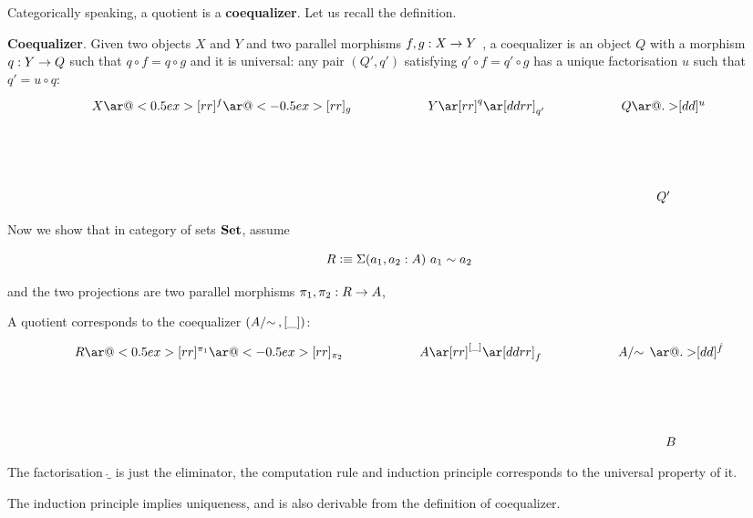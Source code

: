 Categorically speaking, a quotient is a \textbf{coequalizer}. Let us recall the definition.


\begin{definition}
\textbf{Coequalizer}.
Given two objects $X$ and $Y$ and two parallel morphisms $f, g : X \rightarrow Y$ , a coequalizer is an object $Q$ with a morphism $q : Y \rightarrow Q$ such that $q \circ f = q \circ g$ and it is universal: any pair $(Q' , q')$ satisfying $q' \circ f = q' \circ g$ has a unique factorisation $u$ such that $q' = u \circ q$:
\begin{displaymath}
    \xymatrix{X \ar@<0.5ex>[rr]^f \ar@<-0.5ex>[rr]_g && Y \ar[rr]^q
      \ar[ddrr]_{q'} && Q
      \ar@{.>}[dd]^u \\ \\
& &&& Q' }
\end{displaymath}
\end{definition}


Now we show that in category of sets $\operatorname{\mathbf{Set}}$, assume

$$R \vcentcolon\equiv \Sigma (a_1,a_2 : A) ~ a_1 \sim a_2$$


and the two projections are two parallel morphisms $\pi_1,\pi_2 : R \rightarrow A$,

A quotient corresponds to the coequalizer $(\qset{A},[\_])$:
\begin{displaymath}
    \xymatrix{R \ar@<0.5ex>[rr]^{\pi_1} \ar@<-0.5ex>[rr]_{\pi_2} && A \ar[rr]^{ [\_]}
      \ar[ddrr]_{f} && \qset{A}
      \ar@{.>}[dd]^{\hat{f}} \\ \\
& &&& B}
\end{displaymath}

The factorisation $\hat{\_}$ is just the eliminator, the computation rule and induction principle corresponds to the universal property of it. 

\begin{proposition}
The induction principle implies uniqueness, and is also derivable from the definition of coequalizer.
\end{proposition}

